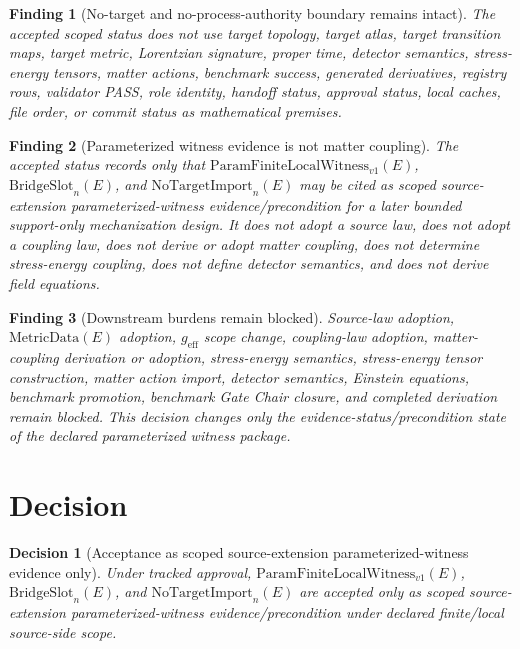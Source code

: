 \documentclass[11pt]{article}
\newcommand{\MetricData}{\mathrm{MetricData}}
\newcommand{\geff}{g_{\mathrm{eff}}}
\newcommand{\ParamWitness}{\mathrm{ParamFiniteLocalWitness}_{v1}}
\newcommand{\BridgeSlot}{\mathrm{BridgeSlot}_{n}}
\newcommand{\NoTargetImport}{\mathrm{NoTargetImport}_{n}}
\newtheorem{decision}{Decision}
\newtheorem{finding}{Finding}
\begin{document}
\begin{finding}[No-target and no-process-authority boundary remains intact]
The accepted scoped status does not use target topology, target atlas, target
transition maps, target metric, Lorentzian signature, proper time, detector
semantics, stress-energy tensors, matter actions, benchmark success, generated
derivatives, registry rows, validator PASS, role identity, handoff status,
approval status, local caches, file order, or commit status as mathematical
premises.
\end{finding}

\begin{finding}[Parameterized witness evidence is not matter coupling]
The accepted status records only that \(\ParamWitness(E)\), \(\BridgeSlot(E)\),
and \(\NoTargetImport(E)\) may be cited as scoped source-extension
parameterized-witness evidence/precondition for a later bounded support-only
mechanization design. It does not adopt a source law, does not adopt a
coupling law, does not derive or adopt matter coupling, does not determine
stress-energy coupling, does not define detector semantics, and does not
derive field equations.
\end{finding}

\begin{finding}[Downstream burdens remain blocked]
Source-law adoption, \(\MetricData(E)\) adoption, \(\geff\) scope change,
coupling-law adoption, matter-coupling derivation or adoption, stress-energy
semantics, stress-energy tensor construction, matter action import, detector
semantics, Einstein equations, benchmark promotion, benchmark Gate Chair
closure, and completed derivation remain blocked. This decision changes only
the evidence-status/precondition state of the declared parameterized witness
package.
\end{finding}

\section{Decision}

\begin{decision}[Acceptance as scoped source-extension parameterized-witness evidence only]
Under tracked approval, \(\ParamWitness(E)\), \(\BridgeSlot(E)\), and
\(\NoTargetImport(E)\) are accepted only as scoped source-extension
parameterized-witness evidence/precondition under declared finite/local
source-side scope.
\end{decision}
\end{document}
